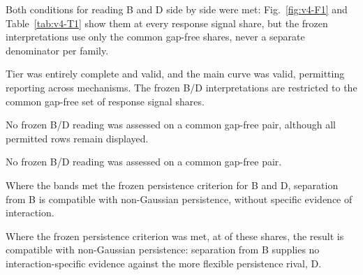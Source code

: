 Both conditions for reading B and D side by side were met: Fig.~\ref{fig:v4-F1} and Table~\ref{tab:v4-T1} show them at every response signal share, but the frozen interpretations use only the common gap-free shares, never a separate denominator per family. %

Tier  was entirely complete and valid, and the main curve was valid, permitting reporting across mechanisms. The frozen B/D interpretations are restricted to the common gap-free set of response signal shares. %

No frozen B/D reading was assessed on a common gap-free pair, although all permitted rows remain displayed. %

No frozen B/D reading was assessed on a common gap-free pair. %

Where the bands met the frozen persistence criterion for B and D, separation from B is compatible with non-Gaussian persistence, without specific evidence of interaction. %

Where the frozen persistence criterion was met, at  of these shares, the result is compatible with non-Gaussian persistence: separation from B supplies no interaction-specific evidence against the more flexible persistence rival, D. %

